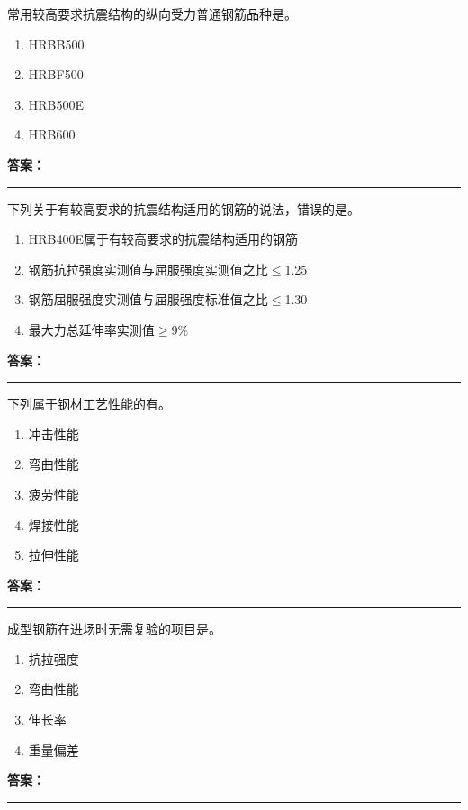 \documentclass[UTF8,fontset=fandol,11pt]{ctexart}
\newcommand{\answerline}{\textcolor{answerred}{\rule{2.4cm}{0.7pt}}}
\begin{document}
\vspace{0.2em}

\begin{quizbox}[title={第 2 题}]
常用较高要求抗震结构的纵向受力普通钢筋品种是。\\
\begin{enumerate}[label=\Alph*.]
\item HRBB500
\item HRBF500
\item HRB500E
\item HRB600
\end{enumerate}
\textbf{\textcolor{answerred}{答案：}} \answerline
\end{quizbox}

\vspace{0.2em}

\begin{quizbox}[title={第 3 题}]
下列关于有较高要求的抗震结构适用的钢筋的说法，错误的是。\\
\begin{enumerate}[label=\Alph*.]
\item HRB400E属于有较高要求的抗震结构适用的钢筋
\item 钢筋抗拉强度实测值与屈服强度实测值之比$\leq$1.25
\item 钢筋屈服强度实测值与屈服强度标准值之比$\leq$1.30
\item 最大力总延伸率实测值$\geq$9\%
\end{enumerate}
\textbf{\textcolor{answerred}{答案：}} \answerline
\end{quizbox}

\vspace{0.2em}

\begin{quizbox}[title={第 4 题}]
下列属于钢材工艺性能的有。\\
\begin{enumerate}[label=\Alph*.]
\item 冲击性能
\item 弯曲性能
\item 疲劳性能
\item 焊接性能
\item 拉伸性能
\end{enumerate}
\textbf{\textcolor{answerred}{答案：}} \answerline
\end{quizbox}

\vspace{0.2em}

\begin{quizbox}[title={第 5 题}]
成型钢筋在进场时无需复验的项目是。\\
\begin{enumerate}[label=\Alph*.]
\item 抗拉强度
\item 弯曲性能
\item 伸长率
\item 重量偏差
\end{enumerate}
\textbf{\textcolor{answerred}{答案：}} \answerline
\end{quizbox}
\end{document}
